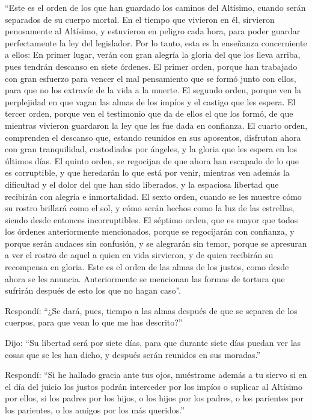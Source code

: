  ``Este es el orden de los que han guardado los caminos
del Altísimo, cuando serán separados de su cuerpo mortal.
 En el tiempo que vivieron en él, sirvieron penosamente
al Altísimo, y estuvieron en peligro cada hora, para poder guardar
perfectamente la ley del legislador.  Por lo tanto, esta
es la enseñanza concerniente a ellos:  En primer lugar,
verán con gran alegría la gloria del que los lleva arriba, pues tendrán
descanso en siete órdenes.  El primer orden, porque han
trabajado con gran esfuerzo para vencer el mal pensamiento que se formó
junto con ellos, para que no los extravíe de la vida a la muerte.
 El segundo orden, porque ven la perplejidad en que vagan
las almas de los impíos y el castigo que les espera.  El
tercer orden, porque ven el testimonio que da de ellos el que los formó,
de que mientras vivieron guardaron la ley que les fue dada en confianza.
 El cuarto orden, comprenden el descanso que, estando
reunidos en sus aposentos, disfrutan ahora con gran tranquilidad,
custodiados por ángeles, y la gloria que les espera en los últimos días.
 El quinto orden, se regocijan de que ahora han escapado
de lo que es corruptible, y que heredarán lo que está por venir,
mientras ven además la dificultad y el dolor del que han sido liberados,
y la espaciosa libertad que recibirán con alegría e inmortalidad.
 El sexto orden, cuando se les muestre cómo su rostro
brillará como el sol, y cómo serán hechos como la luz de las estrellas,
siendo desde entonces incorruptibles.  El séptimo orden,
que es mayor que todos los órdenes anteriormente mencionados, porque se
regocijarán con confianza, y porque serán audaces sin confusión, y se
alegrarán sin temor, porque se apresuran a ver el rostro de aquel a
quien en vida sirvieron, y de quien recibirán su recompensa en gloria.
 Este es el orden de las almas de los justos, como desde
ahora se les anuncia. Anteriormente se mencionan las formas de tortura
que sufrirán después de esto los que no hagan caso''.

 Respondí: ``¿Se dará, pues, tiempo a las almas después
de que se separen de los cuerpos, para que vean lo que me has
descrito?''

 Dijo: ``Su libertad será por siete días, para que
durante siete días puedan ver las cosas que se les han dicho, y después
serán reunidos en sus moradas.''

 Respondí: ``Si he hallado gracia ante tus ojos,
muéstrame además a tu siervo si en el día del juicio los justos podrán
interceder por los impíos o suplicar al Altísimo por ellos,
 si los padres por los hijos, o los hijos por los
padres, o los parientes por los parientes, o los amigos por los más
queridos.''


